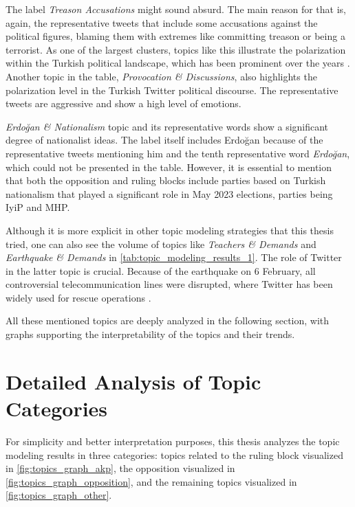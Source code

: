 The label \textit{Treason Accusations} might sound absurd. The main reason for that is, again, 
the representative tweets that include some accusations against the political figures, 
blaming them with extremes like committing treason or being a terrorist. As one of the largest 
clusters, topics like this illustrate the polarization within the Turkish political landscape, 
which has been prominent over the years \parencite{cevik_turkey_polarization_2018}. 
Another topic in the table, \textit{Provocation \& Discussions}, also highlights the 
polarization level in the Turkish Twitter political discourse. The representative tweets are 
aggressive and show a high level of emotions.

\textit{Erdoğan \& Nationalism} topic and its representative words show a significant degree 
of nationalist ideas. The label itself includes Erdoğan because of the representative tweets 
mentioning him and the tenth representative word \textit{Erdoğan}, which could not be presented in the table. 
However, it is essential to mention that both the opposition and ruling blocks 
include parties based on Turkish nationalism that played a significant role in May 2023 
elections, parties being \ac{IyiP} and \ac{MHP}.

Although it is more explicit in other topic modeling strategies that this thesis tried, 
one can also see the volume of topics like \textit{Teachers \& Demands} and \textit{Earthquake \& Demands} 
in \autoref{tab:topic_modeling_results_1}. The role of Twitter in the latter topic is crucial. 
Because of the earthquake on 6 February, all controversial telecommunication lines were disrupted, 
where Twitter has been widely used for rescue operations \parencite{cevik_aksoy_turkey_earthquake_2023}.

All these mentioned topics are deeply analyzed in the following section, with 
graphs supporting the interpretability of the topics and their trends.

\section{Detailed Analysis of Topic Categories}

For simplicity and better interpretation purposes, this thesis analyzes the topic modeling results 
in three categories: topics related to the ruling block visualized in \autoref{fig:topics_graph_akp}, 
the opposition visualized in \autoref{fig:topics_graph_opposition}, and the remaining topics 
visualized in \autoref{fig:topics_graph_other}. 

